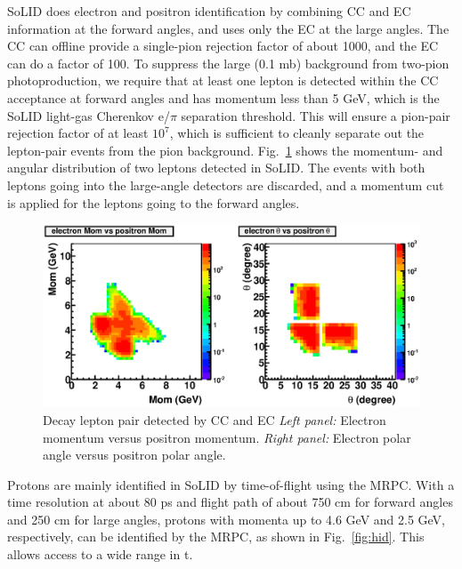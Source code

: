 SoLID does electron and positron identification by combining CC and EC
information at the forward angles, and uses only the EC at the large angles.
The CC can offline provide a single-pion rejection factor of about 1000, and
the EC can do a factor of 100. To suppress the large (0.1 mb) background from
two-pion photoproduction, we require that at least one lepton is detected
within the CC acceptance at forward angles and has momentum less than 5 GeV,
which is the SoLID light-gas Cherenkov e/$\pi$ separation threshold. This will
ensure a pion-pair rejection factor of at least $10^7$, which is sufficient to
cleanly separate out the lepton-pair events from the pion background.
Fig.~\ref{fig:eid} shows the momentum- and angular distribution of two leptons
detected in SoLID. The events with both leptons going into the large-angle
detectors are discarded, and a momentum cut is applied for the leptons going
to the forward angles.

\begin{figure}[t]
\includegraphics[width=125mm]{ep_final.eps}
\caption{\small{Decay lepton pair detected by CC and EC
{\it Left panel:} Electron momentum versus positron momentum.
{\it Right panel:} Electron polar angle versus positron polar angle.}}
\label{fig:eid}
\end{figure}

Protons are mainly identified in SoLID by time-of-flight using the MRPC. With
a time resolution at about 80 ps and flight path of about 750 cm for forward
angles and 250 cm for large angles, protons with momenta up to 4.6 GeV and 2.5
GeV, respectively, can be identified by the MRPC, as shown in
Fig.~\ref{fig:hid}. This allows access to a wide range in t.

